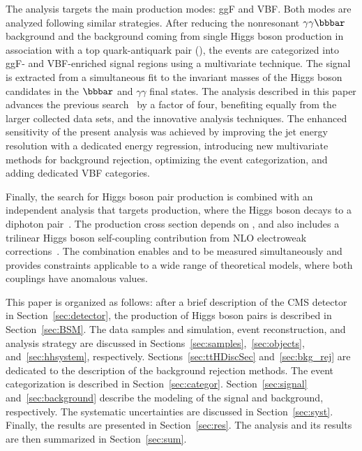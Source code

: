 \documentclass[11pt,twoside,a4paper,cmspaper,final,collab]{cms-tdr}
\begin{document}
The analysis targets the main \HH production modes: ggF and VBF. Both modes are analyzed following similar strategies.
After reducing the nonresonant $\bbgg$ background and the background coming from single Higgs boson production in association with a top quark-antiquark pair (\ttH), the events are categorized into ggF- and VBF-enriched signal regions using a multivariate technique. The signal is extracted from a simultaneous fit to the invariant masses of the 
Higgs boson candidates in the $\bb$ and $\gamma\gamma$ final states.
The analysis described in this paper advances the previous \ppHHbbgg search~\cite{Sirunyan:2018iwt} by a factor of four, benefiting equally from the larger collected data sets, and the innovative analysis techniques. The enhanced sensitivity of the present analysis was achieved by improving the {\cPqb} jet energy resolution with a dedicated energy regression, introducing new multivariate methods for background rejection, optimizing the event categorization, and adding dedicated VBF categories. 


Finally, the search for Higgs boson pair production is combined with an independent analysis that targets \ttH production, where the Higgs boson decays to a diphoton pair~\cite{Sirunyan:2020sum}. The \ttH production cross section depends on \yt, and also includes a trilinear Higgs boson self-coupling contribution from NLO electroweak corrections~\cite{Maltoni:2017ims,Degrassi:2016wml}. The combination enables \lbdHHH and \yt to be measured simultaneously and provides constraints applicable to a wide range of theoretical models, where both couplings have anomalous values.

This paper is organized as follows: after a brief description of the CMS detector in Section~\ref{sec:detector}, the production of Higgs boson pairs is described in Section~\ref{sec:BSM}. The data samples and simulation, event reconstruction, and analysis strategy are discussed in Sections~\ref{sec:samples},~\ref{sec:objects}, and~\ref{sec:hhsystem}, respectively. Sections~\ref{sec:ttHDiscSec} and~\ref{sec:bkg_rej} are dedicated to the description of the background rejection methods. The event categorization is described in Section~\ref{sec:categor}. Section~\ref{sec:signal} and~\ref{sec:background} describe the modeling of the signal and background, respectively. The systematic uncertainties are discussed in Section~\ref{sec:syst}. Finally, the results are presented in Section~\ref{sec:res}. The analysis and its results are then summarized in Section~\ref{sec:sum}.
 
\end{document}
